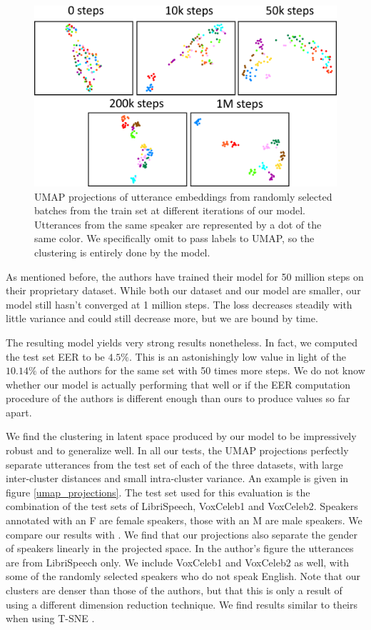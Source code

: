 \documentclass[a4paper, oneside, 12pt, english]{article}
\begin{document}
\begin{figure}[h]
	\centering
	\includegraphics[width=\linewidth]{images/training_umap.png}
	\caption{UMAP projections of utterance embeddings from randomly selected batches from the train set at different iterations of our model. Utterances from the same speaker are represented by a dot of the same color. We specifically omit to pass labels to UMAP, so the clustering is entirely done by the model.}
	\label{training_umap}
\end{figure}

As mentioned before, the authors have trained their model for 50 million steps on their proprietary dataset. While both our dataset and our model are smaller, our model still hasn't converged at 1 million steps. The loss decreases steadily with little variance and could still decrease more, but we are bound by time. 

The resulting model yields very strong results nonetheless. In fact, we computed the test set EER to be $\mathbf{4.5\%}$. This is an astonishingly low value in light of the $10.14\%$ of the authors for the same set with 50 times more steps. We do not know whether our model is actually performing that well or if the EER computation procedure of the authors is different enough than ours to produce values so far apart.

We find the clustering in latent space produced by our model to be impressively robust and to generalize well. In all our tests, the UMAP projections perfectly separate utterances from the test set of each of the three datasets, with large inter-cluster distances and small intra-cluster variance. An example is given in figure \ref{umap_projections}. The test set used for this evaluation is the combination of the test sets of LibriSpeech, VoxCeleb1 and VoxCeleb2. Speakers annotated with an F are female speakers, those with an M are male speakers. We compare our results with \citep[Figure 3]{SV2TTS}. We find that our projections also separate the gender of speakers linearly in the projected space. In the author's figure the utterances are from LibriSpeech only. We include VoxCeleb1 and VoxCeleb2 as well, with some of the randomly selected speakers who do not speak English. Note that our clusters are denser than those of the authors, but that this is only a result of using a different dimension reduction technique. We find results similar to theirs when using T-SNE \citep{TSNE}.
\end{document}
